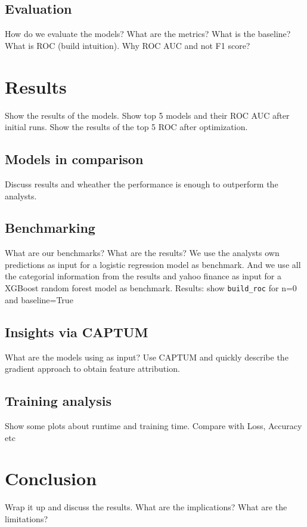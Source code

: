 \documentclass[conference]{IEEEtran}
\begin{document}
\subsection{Evaluation} %
How do we evaluate the models? What are the metrics? What is the baseline?
What is ROC (build intuition).
Why ROC AUC and not F1 score?

\section{Results}%
Show the results of the models.  Show top 5 models and their ROC AUC after initial runs.
Show the results of the top 5 ROC after optimization.
\subsection{Models in comparison}%
Discuss results and wheather the performance is enough to outperform the analysts.
\subsection{Benchmarking}%
What are our benchmarks? What are the results?
We use the analysts own predictions as input for a logistic regression model as benchmark.
And we use all the categorial information from the results and yahoo finance as input for a XGBoost random forest model as benchmark.
Results: show \texttt{build\_roc} for n=0 and baseline=True

\subsection{Insights via CAPTUM}%
What are the models using as input? Use CAPTUM and quickly describe the gradient approach to obtain feature attribution.
\subsection{Training analysis}%
Show some plots about runtime and training time. Compare with Loss, Accuracy etc

\section{Conclusion}
Wrap it up and discuss the results. What are the implications? What are the limitations?


\end{document}
